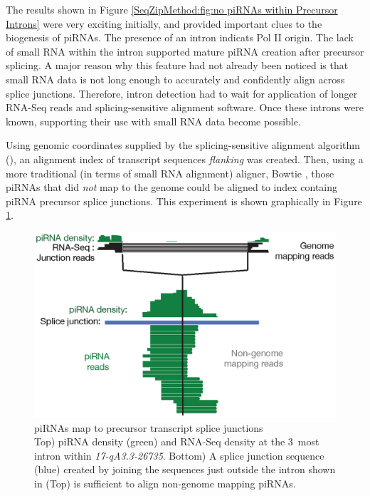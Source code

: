   The results shown in Figure \ref{SeqZipMethod:fig:no piRNAs within Precursor Introns} were very exciting initially, and provided important clues to the biogenesis of piRNAs. The presence of an intron indicats Pol II origin. The lack of small RNA within the intron supported mature piRNA creation after precursor splicing. A major reason why this feature had not already been noticed is that small RNA data is not long enough to accurately and confidently align across splice junctions. Therefore, intron detection had to wait for application of longer RNA-Seq reads and splicing-sensitive alignment software. Once these introns were known, supporting their use with small RNA data become possible.

  Using genomic coordinates supplied by the splicing-sensitive alignment algorithm (\citep{Trapnell2009}), an alignment index of transcript sequences \textit{flanking} was created. Then, using a more traditional (in terms of small RNA alignment) aligner, Bowtie \citep{Langmead2009}, those piRNAs that did \textit{not} map to the genome could be aligned to index containg piRNA precursor splice junctions. This experiment is shown graphically in Figure \ref{SeqZipMethod:fig: piRNAs map to SJ}.

  \begin{figure} %
    \centering 
    \includegraphics{Figures/SeqZipMethod/smallRNAsMapToPrecursorSJ.eps}
    \caption[piRNAs map to precursor transcript splice junctions]
    {
      piRNAs map to precursor transcript splice junctions\\[0.25cm]
      Top) piRNA density (green) and RNA-Seq density at the 3\textprime~most intron within \textit{17-qA3.3-26735}. Bottom) A splice junction sequence (blue) created by joining the sequences just outside the intron shown in (Top) is sufficient to align non-genome mapping piRNAs.
      }
    \label{SeqZipMethod:fig: piRNAs map to SJ}
    \end{figure}


